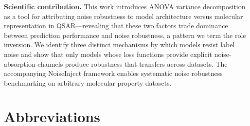 \documentclass[pdflatex,sn-mathphys-num]{sn-jnl}%
\theoremstyle{thmstyleone}%
\theoremstyle{thmstyletwo}%
\theoremstyle{thmstylethree}%
\begin{document}
\noindent\textbf{Scientific contribution.} This work introduces ANOVA variance decomposition as a tool for attributing noise robustness to model architecture versus molecular representation in QSAR---revealing that these two factors trade dominance between prediction performance and noise robustness, a pattern we term the role inversion. We identify three distinct mechanisms by which models resist label noise and show that only models whose loss functions provide explicit noise-absorption channels produce robustness that transfers across datasets. The accompanying NoiseInject framework enables systematic noise robustness benchmarking on arbitrary molecular property datasets.


\section*{Abbreviations}
\end{document}
